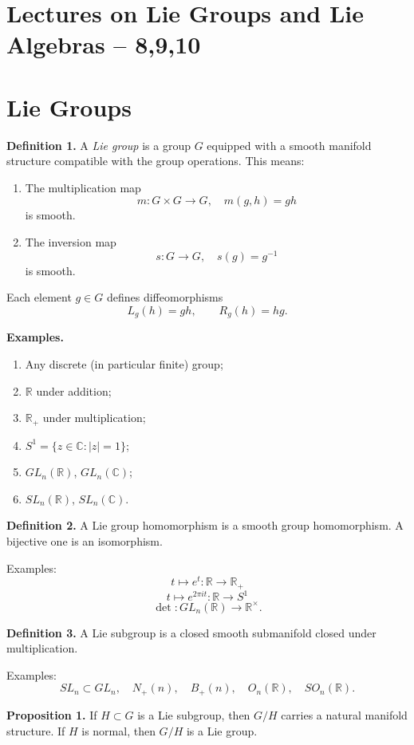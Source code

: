 \section*{Lectures on Lie Groups and Lie Algebras – 8,9,10}

\section*{Lie Groups}

\textbf{Definition 1.}
A \emph{Lie group} is a group $G$ equipped with a smooth manifold structure
compatible with the group operations. This means:

\begin{enumerate}
\item The multiplication map
\[
m : G \times G \to G, \quad m(g,h)=gh
\]
is smooth.

\item The inversion map
\[
s : G \to G, \quad s(g)=g^{-1}
\]
is smooth.
\end{enumerate}

Each element $g\in G$ defines diffeomorphisms
\[
L_g(h)=gh, \qquad R_g(h)=hg.
\]

\textbf{Examples.}

\begin{enumerate}
\item Any discrete (in particular finite) group;
\item $\mathbb{R}$ under addition;
\item $\mathbb{R}_+$ under multiplication;
\item $S^1 = \{z\in\mathbb{C} : |z|=1\}$;
\item $GL_n(\mathbb{R})$, $GL_n(\mathbb{C})$;
\item $SL_n(\mathbb{R})$, $SL_n(\mathbb{C})$.
\end{enumerate}

\textbf{Definition 2.}
A Lie group homomorphism is a smooth group homomorphism.
A bijective one is an isomorphism.

Examples:
\[
t \mapsto e^t : \mathbb{R}\to\mathbb{R}_+
\]
\[
t \mapsto e^{2\pi i t} : \mathbb{R}\to S^1
\]
\[
\det : GL_n(\mathbb{R}) \to \mathbb{R}^\times.
\]

\textbf{Definition 3.}
A Lie subgroup is a closed smooth submanifold closed under multiplication.

Examples:
\[
SL_n \subset GL_n, \quad N_+(n), \quad B_+(n), \quad O_n(\mathbb{R}), \quad SO_n(\mathbb{R}).
\]

\textbf{Proposition 1.}
If $H\subset G$ is a Lie subgroup, then $G/H$ carries a natural manifold structure.
If $H$ is normal, then $G/H$ is a Lie group.


